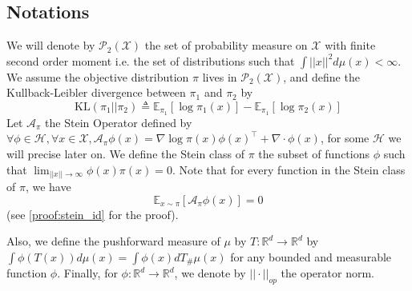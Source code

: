 \documentclass{article}
\newcommand{\R}{\mathbb{R}}
\newcommand{\E}{\mathbb{E}}
\newcommand{\X}{\mathcal{X}}
\newcommand{\A}{\mathcal{A}}
\renewcommand{\P}{\mathcal{P}}
\newcommand{\KL}{\mathrm{KL}}
\renewcommand{\H}{\mathcal{H}}
\begin{document}
\subsection{Notations}
We will denote by $\P_2(\X)$ the set of probability measure on $\X$ with finite second order moment i.e. the set of distributions such that $\int ||x||^2 d\mu(x) < \infty$. We assume the objective distribution $\pi$ lives in $\P_2(\X)$, and define the Kullback-Leibler divergence between $\pi_1$ and $\pi_2$ by
$$\KL(\pi_1||\pi_2) \triangleq \E_{\pi_1} [\log \pi_1(x)] - \E_{\pi_1}[\log \pi_2(x)]$$ \newline
Let $\A_\pi$ the Stein Operator defined by $\forall \phi \in \H, \forall x \in \X, \A_\pi \phi(x) = \nabla \log \pi(x) \phi(x)^\top + \nabla\cdot \phi(x)$, for some $\H$ we will precise later on. \newline
We define the Stein class of $\pi$ the subset of functions $\phi$ such that $\lim_{||x||\longrightarrow \infty} \phi(x)\pi(x) = 0$. Note that for every function in the Stein class of $\pi$, we have \begin{equation}
  \E_{x \sim \pi}[\A_\pi \phi (x)] = 0
  \label{eq:stein_id}
\end{equation}
(see \ref{proof:stein_id} for the proof).\newline

Also, we define the pushforward measure of $\mu$ by $T:\R^d \longrightarrow \R^d$ by $\int \phi(T(x)) d\mu(x) = \int \phi(x) dT_\#\mu(x)$ for any bounded and measurable function $\phi$. \newline
Finally, for $\phi : \R^d \longrightarrow \R^d$, we denote by $||\cdot||_{op}$ the operator norm. \newline
\end{document}

